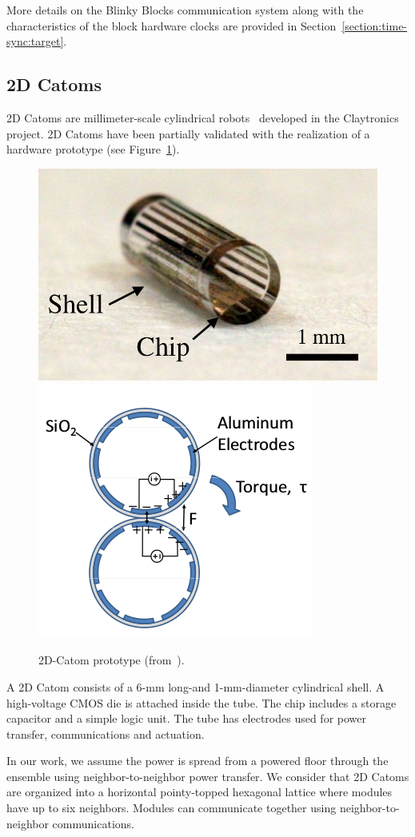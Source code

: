 More details on the Blinky Blocks communication system along with the characteristics of the block hardware clocks are provided in Section~\ref{section:time-sync:target}.

\subsection{2D Catoms}
\label{section:context:catom2D}

2D Catoms are millimeter-scale cylindrical robots~\cite{karagozler-iros09,karagozler-phdthesis} developed in the Claytronics project. 2D Catoms have been partially validated with the realization of a hardware prototype (see Figure~\ref{fig:context:catom2D}).

\begin{figure}[!h]
	\centering
	\includegraphics[width=0.35\linewidth]{images/context/catom_fabricated.png}
	\includegraphics[width=0.35\linewidth]{images/context/catom_actuation.png}
	\caption{2D-Catom prototype (from~\cite{karagozler-phdthesis}).}
	\label{fig:context:catom2D}
\end{figure}

A 2D Catom consists of a 6-mm long-and 1-mm-diameter cylindrical shell. A high-voltage CMOS die is attached inside the tube. The chip includes a storage capacitor and a simple logic unit. The tube has electrodes used for power transfer, communications and actuation. 

In our work, we assume the power is spread from a powered floor through the ensemble using neighbor-to-neighbor power transfer. We consider that 2D Catoms are organized into a horizontal pointy-topped hexagonal lattice where modules have up to six neighbors. Modules can communicate together using neighbor-to-neighbor communications. 


